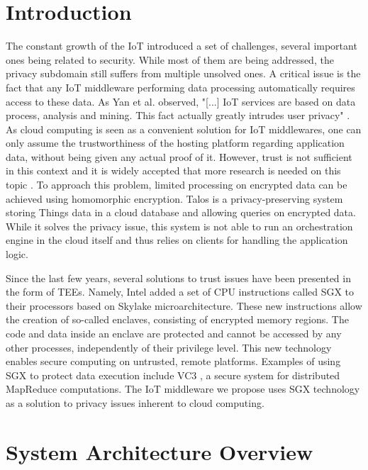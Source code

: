 \documentclass{sigchi}
\begin{document}
\section{Introduction}

The constant growth of the IoT introduced a set of challenges, several important ones being related to security. While most of them are being addressed, the privacy subdomain still suffers from multiple unsolved ones. A critical issue is the fact that any IoT middleware performing data processing automatically requires access to these data. As Yan et al. observed, "[...] IoT services are based on data process, analysis and mining. This fact actually greatly intrudes user privacy" \cite{yan_trust_survey}. As cloud computing is seen as a convenient solution for IoT middlewares, one can only assume the trustworthiness of the hosting platform regarding application data, without being given any actual proof of it. However, trust is not sufficient in this context and it is widely accepted that more research is needed on this topic \cite{yan_trust_survey}\cite{sicari_privacy_survey}\cite{botta_survey}. To approach this problem, limited processing on encrypted data can be achieved using homomorphic encryption. Talos \cite{shafagh_talos} is a privacy-preserving system storing Things data in a cloud database and allowing queries on encrypted data. While it solves the privacy issue, this system is not able to run an orchestration engine in the cloud itself and thus relies on clients for handling the application logic. 

Since the last few years, several solutions to trust issues have been presented in the form of TEEs. Namely, Intel added a set of CPU instructions called SGX to their processors based on Skylake microarchitecture. These new instructions allow the creation of so-called enclaves, consisting of encrypted memory regions. The code and data inside an enclave are protected and cannot be accessed by any other processes, independently of their privilege level. This new technology enables secure computing on untrusted, remote platforms. Examples of using SGX to protect data execution include VC3 \cite{schuster_vc3}, a secure system for distributed MapReduce computations. The IoT middleware we propose uses SGX technology as a solution to privacy issues inherent to cloud computing.

\section{System Architecture Overview}
\end{document}
